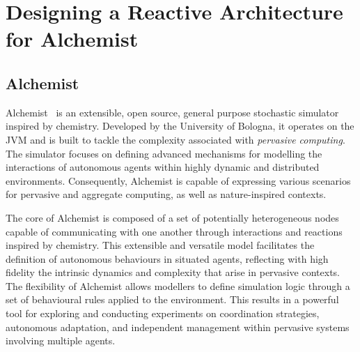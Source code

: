 \chapter{Designing a Reactive Architecture for Alchemist}\label{ch:design_alchemist}

\section{Alchemist}
Alchemist~\cite{pianini2013COSCSA} is an extensible, open source, general
purpose stochastic simulator inspired by chemistry. Developed by the University
of Bologna, it operates on the \ac{JVM} and is built to tackle the complexity
associated with \emph{pervasive computing}. The simulator focuses on defining
advanced mechanisms for modelling the interactions of autonomous agents within
highly dynamic and distributed environments. Consequently, Alchemist is capable
of expressing various scenarios for pervasive and aggregate computing, as well
as nature-inspired contexts.

The core of Alchemist is composed of a set of potentially heterogeneous nodes
capable of communicating with one another through interactions and reactions
inspired by chemistry. This extensible and versatile model facilitates the
definition of autonomous behaviours in situated agents, reflecting with high
fidelity the intrinsic dynamics and complexity that arise in pervasive
contexts. The flexibility of Alchemist allows modellers to define simulation
logic through a set of behavioural rules applied to the environment. This
results in a powerful tool for exploring and conducting experiments on
coordination strategies, autonomous adaptation, and independent management
within pervasive systems involving multiple agents.

